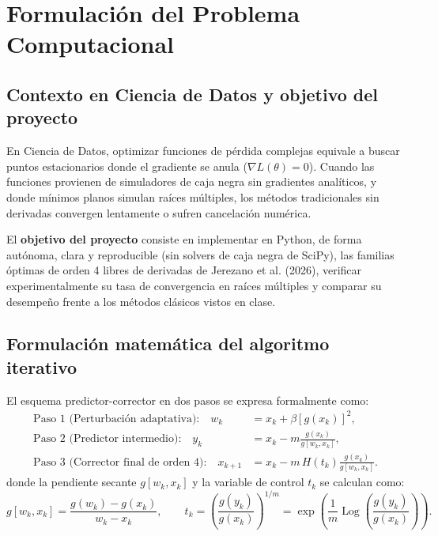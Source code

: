 ﻿\documentclass[10pt, a4paper]{article}
\begin{document}
\section{Formulación del Problema Computacional}

\subsection{Contexto en Ciencia de Datos y objetivo del proyecto}
En Ciencia de Datos, optimizar funciones de pérdida complejas equivale a buscar puntos estacionarios donde el gradiente se anula ($\nabla L(\theta) = 0$). Cuando las funciones provienen de simuladores de caja negra sin gradientes analíticos, y donde mínimos planos simulan raíces múltiples, los métodos tradicionales sin derivadas convergen lentamente o sufren cancelación numérica.

El \textbf{objetivo del proyecto} consiste en implementar en Python, de forma autónoma, clara y reproducible (sin solvers de caja negra de SciPy), las familias óptimas de orden 4 libres de derivadas de Jerezano et al. (2026), verificar experimentalmente su tasa de convergencia en raíces múltiples y comparar su desempeño frente a los métodos clásicos vistos en clase.

\subsection{Formulación matemática del algoritmo iterativo}
El esquema predictor-corrector en dos pasos se expresa formalmente como:
\begin{align}
    \text{Paso 1 (Perturbación adaptativa):} \quad w_k &= x_k + \beta [g(x_k)]^2, \label{eq:paso1} \\[2pt]
    \text{Paso 2 (Predictor intermedio):} \quad y_k &= x_k - m \frac{g(x_k)}{g[w_k, x_k]}, \label{eq:paso2} \\[2pt]
    \text{Paso 3 (Corrector final de orden 4):} \quad x_{k+1} &= x_k - m \, H(t_k) \frac{g(x_k)}{g[w_k, x_k]}. \label{eq:paso3}
\end{align}
donde la pendiente secante $g[w_k, x_k]$ y la variable de control $t_k$ se calculan como:
\begin{equation}
    g[w_k, x_k] = \frac{g(w_k) - g(x_k)}{w_k - x_k}, \qquad 
    t_k = \left( \frac{g(y_k)}{g(x_k)} \right)^{1/m} = \exp\left( \frac{1}{m} \operatorname{Log}\left(\frac{g(y_k)}{g(x_k)}\right) \right).
\end{equation}
\end{document}
